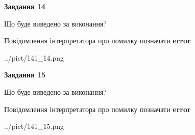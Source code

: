 \documentclass[11pt, ukrainian]{article}
\begin{document}
{\begin {large}
{\begin {center}\textbf{Завдання 14}\end {center}}\par
Що буде виведено за виконання? \par
Повідомлення інтерпретатора про помилку позначати \textbf{error}

\begin{center}
	{../pict/141_14.png}
\end{center}
\newpage

{\begin {center}\textbf{Завдання 15}\end {center}}\par
Що буде виведено за виконання? \par
Повідомлення інтерпретатора про помилку позначати \textbf{error}

\begin{center}
	{../pict/141_15.png}
\end{center}
\newpage

\end {large}}
\end{document}
